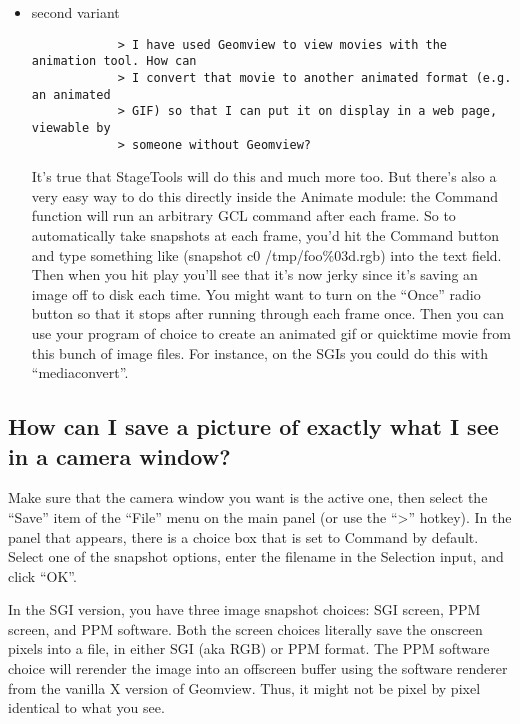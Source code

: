 \documentclass[12pt,a4paper]{article}
\begin{document}
\begin{itemize}
        \item second variant \\
    	    \tiny
	    \begin{verbatim}
            > I have used Geomview to view movies with the animation tool. How can
            > I convert that movie to another animated format (e.g. an animated
            > GIF) so that I can put it on display in a web page, viewable by
            > someone without Geomview?
	    \end{verbatim}
	    \normalsize
	    
            It's true that StageTools will do this and much more too. But
            there's also a very easy way to do this directly inside the Animate
            module: the Command function will run an arbitrary GCL command after
            each frame. So to automatically take snapshots at each frame, you'd
            hit the Command button and type something like
            (snapshot c0 /tmp/foo\%03d.rgb)
            into the text field. Then when you hit play you'll see that it's now
            jerky since it's saving an image off to disk each time. You might
            want to turn on the ``Once'' radio button so that it stops after
            running through each frame once. Then you can use your program of
            choice to create an animated gif or quicktime movie from this bunch
            of image files. For instance, on the SGIs you could do this with
            ``mediaconvert''.
        \end{itemize}

    \subsection{How can I save a picture of exactly what I see in a camera window?}

        Make sure that the camera window you want is the active one, then select
        the ``Save'' item of the ``File'' menu on the main panel (or use the ``>''
        hotkey). In the panel that appears, there is a choice box that is set to
        Command by default. Select one of the snapshot options, enter the
        filename in the Selection input, and click ``OK''.

        In the SGI version, you have three image snapshot choices: SGI screen,
        PPM screen, and PPM software. Both the screen choices literally save the
        onscreen pixels into a file, in either SGI (aka RGB) or PPM format. The
        PPM software choice will rerender the image into an offscreen buffer
        using the software renderer from the vanilla X version of Geomview.
        Thus, it might not be pixel by pixel identical to what you see.
\end{document}
